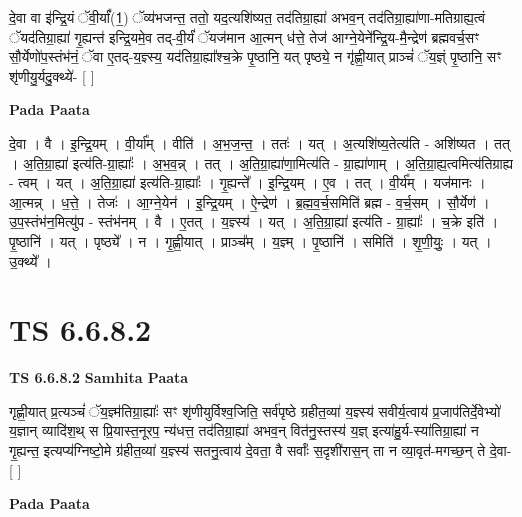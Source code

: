 \documentclass[17pt]{extarticle}
\begin{document}
दे॒वा वा इ॑न्द्रि॒यं ॅवी॒र्यां᳚(1॒) ॅव्य॑भजन्त॒ ततो॒ यद॒त्यशि॑ष्यत॒ तद॑तिग्रा॒ह्या॑ अभव॒न् तद॑तिग्रा॒ह्या॑णा-मतिग्राह्य॒त्वं ॅयद॑तिग्रा॒ह्या॑ गृ॒ह्यन्त॑ इन्द्रि॒यमे॒व तद्-वी॒र्यं॑ ॅयज॑मान आ॒त्मन् ध॑त्ते॒ तेज॑ आग्ने॒येने᳚न्द्रि॒य-मै॒न्द्रेण॑ ब्रह्मवर्च॒सꣳ सौ॒र्येणो॑प॒स्तंभ॑नं॒ ॅवा ए॒तद्-य॒ज्ञ्स्य॒ यद॑तिग्रा॒ह्या᳚श्च॒क्रे पृ॒ष्ठानि॒ यत् पृष्ठ्ये॒ न गृ॑ह्णी॒यात् प्राञ्चं॑ ॅय॒ज्ञ्ं पृ॒ष्ठानि॒ सꣳ शृ॑णीयु॒र्यदु॒क्थ्ये॑- [  ] \newline

\textbf{Pada Paata} \newline

दे॒वा । वै । इ॒न्द्रि॒यम् । वी॒र्या᳚म् । वीति॑ । अ॒भ॒ज॒न्त॒ । ततः॑ । यत् । अ॒त्यशि॑ष्य॒तेत्य॑ति - अशि॑ष्यत । तत् । अ॒ति॒ग्रा॒ह्या॑ इत्य॑ति-ग्रा॒ह्याः᳚ । अ॒भ॒व॒न्न् । तत् । अ॒ति॒ग्रा॒ह्या॑णा॒मित्य॑ति - ग्रा॒ह्या॑णाम् । अ॒ति॒ग्रा॒ह्य॒त्वमित्य॑तिग्राह्य - त्वम् । यत् । अ॒ति॒ग्रा॒ह्या॑ इत्य॑ति-ग्रा॒ह्याः᳚ । गृ॒ह्यन्ते᳚ । इ॒न्द्रि॒यम् । ए॒व । तत् । वी॒र्य᳚म् । यज॑मानः । आ॒त्मन्न् । ध॒त्ते॒ । तेजः॑ । आ॒ग्ने॒येन॑ । इ॒न्द्रि॒यम् । ऐ॒न्द्रेण॑ । ब्र॒ह्म॒व॒र्च॒समिति॑ ब्रह्म - व॒र्च॒सम् । सौ॒र्येण॑ । उ॒प॒स्तंभ॑न॒मित्यु॑प - स्तंभ॑नम् । वै । ए॒तत् । य॒ज्ञ्स्य॑ । यत् । अ॒ति॒ग्रा॒ह्या॑ इत्य॑ति - ग्रा॒ह्याः᳚ । च॒क्रे इति॑ । पृ॒ष्ठानि॑ । यत् । पृष्ठ्ये᳚ । न । गृ॒ह्णी॒यात् । प्राञ्च᳚म् । य॒ज्ञ्म् । पृ॒ष्ठानि॑ । समिति॑ । शृ॒णी॒युः॒ । यत् । उ॒क्थ्ये᳚ ।  \newline





\section{ TS 6.6.8.2 }

\textbf{TS 6.6.8.2 } \newline
\textbf{Samhita Paata} \newline

गृह्णी॒यात् प्र॒त्यञ्चं॑ ॅय॒ज्ञ्म॑तिग्रा॒ह्याः᳚ सꣳ शृ॑णीयुर्विश्व॒जिति॒ सर्व॑पृष्ठे ग्रहीत॒व्या॑ य॒ज्ञ्स्य॑ सवीर्य॒त्वाय॑ प्र॒जाप॑तिर्दे॒वेभ्यो॑ य॒ज्ञान् व्यादि॑श॒थ् स प्रि॒यास्त॒नूरप॒ न्य॑धत्त॒ तद॑तिग्रा॒ह्या॑ अभव॒न् वित॑नु॒स्तस्य॑ य॒ज्ञ् इत्या॑हु॒र्य-स्या॑तिग्रा॒ह्या॑ न गृ॒ह्यन्त॒ इत्यप्य॑ग्निष्टो॒मे ग्र॑हीत॒व्या॑ य॒ज्ञ्स्य॑ सतनु॒त्वाय॑ दे॒वता॒ वै सर्वाः᳚ स॒दृशी॑रास॒न् ता न व्या॒वृत॑-मगच्छ॒न् ते दे॒वा- [  ] \newline

\textbf{Pada Paata} \newline
\end{document}
